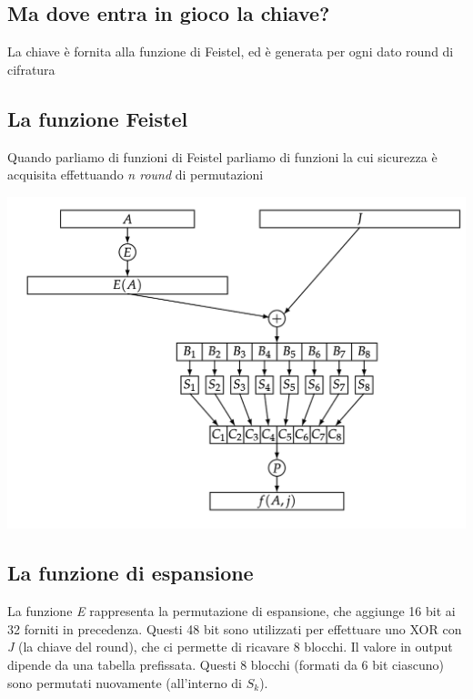 \documentclass[11pt, oneside]{article}   	%
\begin{document}
\subsection*{Ma dove entra in gioco la chiave?} 
La chiave è fornita alla funzione di Feistel, ed è generata per ogni dato round di cifratura
\subsection*{La funzione Feistel}
Quando parliamo di funzioni di Feistel parliamo di funzioni la cui sicurezza è acquisita effettuando \emph{n round} di permutazioni
\begin{center}
\includegraphics[scale= 0.4]{feistel}
\end{center}
\subsection*{La funzione di espansione}
La funzione \emph{E} rappresenta la permutazione di espansione, che aggiunge 16 bit ai 32 forniti in precedenza. Questi 48 bit sono utilizzati per effettuare uno XOR con \emph{J} (la chiave del round), che ci permette di ricavare 8 blocchi. Il valore in output dipende da una tabella prefissata.
Questi 8 blocchi (formati da 6 bit ciascuno) sono permutati nuovamente (all'interno di $S_k$).
\end{document}
